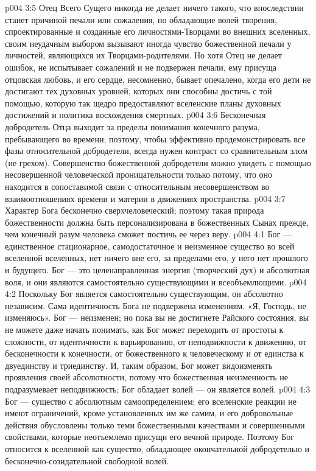 \vs p004 3:5 Отец Всего Сущего никогда не делает ничего такого, что впоследствии станет причиной печали или сожаления, но обладающие волей творения, спроектированные и созданные его личностями\hyp{}Творцами во внешних вселенных, своим неудачным выбором вызывают иногда чувство божественной печали у личностей, являющихся их Творцами\hyp{}родителями. Но хотя Отец не делает ошибок, не испытывает сожалений и не подвержен печали, ему присуща отцовская любовь, и его сердце, несомненно, бывает опечалено, когда его дети не достигают тех духовных уровней, которых они способны достичь с той помощью, которую так щедро предоставляют вселенские планы духовных достижений и политика восхождения смертных.
\vs p004 3:6 Бесконечная добродетель Отца выходит за пределы понимания конечного разума, пребывающего во времени; поэтому, чтобы эффективно продемонстрировать все фазы относительной добродетели, всегда нужен контраст со сравнительным злом (не грехом). Совершенство божественной добродетели можно увидеть с помощью несовершенной человеческой проницательности только потому, что оно находится в сопоставимой связи с относительным несовершенством во взаимоотношениях времени и материи в движениях пространства.
\vs p004 3:7 Характер Бога бесконечно сверхчеловеческий; поэтому такая природа божественности должна быть персонализирована в божественных Сынах прежде, чем конечный разум человека сможет постичь ее через веру.
\vs p004 4:1 Бог --- единственное стационарное, самодостаточное и неизменное существо во всей вселенной вселенных, нет ничего вне его, за пределами его, у него нет прошлого и будущего. Бог --- это целенаправленная энергия (творческий дух) и абсолютная воля, и они являются самостоятельно существующими и всеобъемлющими.
\vs p004 4:2 Поскольку Бог является самостоятельно существующим, он абсолютно независим. Сама идентичность Бога не подвержена изменениям. «Я, Господь, не изменяюсь». Бог --- неизменен; но пока вы не достигнете Райского состояния, вы не можете даже начать понимать, как Бог может переходить от простоты к сложности, от идентичности к варьированию, от неподвижности к движению, от бесконечности к конечности, от божественного к человеческому и от единства к двуединству и триединству. И, таким образом, Бог может видоизменять проявления своей абсолютности, потому что божественная неизменность не подразумевает неподвижность; Бог обладает волей --- он является волей.
\vs p004 4:3 Бог --- существо с абсолютным самоопределением; его вселенские реакции не имеют ограничений, кроме установленных им же самим, и его добровольные действия обусловлены только теми божественными качествами и совершенными свойствами, которые неотъемлемо присущи его вечной природе. Поэтому Бог относится к вселенной как существо, обладающее окончательной добродетелью и бесконечно\hyp{}созидательной свободной волей.
